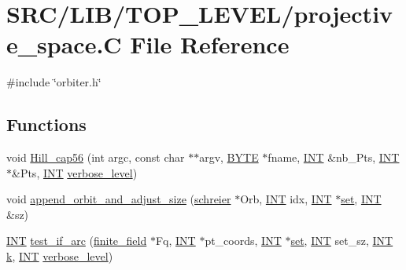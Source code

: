 \hypertarget{_t_o_p___l_e_v_e_l_2projective__space_8_c}{}\section{S\+R\+C/\+L\+I\+B/\+T\+O\+P\+\_\+\+L\+E\+V\+E\+L/projective\+\_\+space.C File Reference}
\label{_t_o_p___l_e_v_e_l_2projective__space_8_c}
{\ttfamily \#include \char`\"{}orbiter.\+h\char`\"{}}\newline
\subsection*{Functions}
\begin{DoxyCompactItemize}
\item 
void \mbox{\hyperlink{_t_o_p___l_e_v_e_l_2projective__space_8_c_ad7fc0ff2bf8455ab25e170c6930047a6}{Hill\+\_\+cap56}} (int argc, const char $\ast$$\ast$argv, \mbox{\hyperlink{galois_8h_ab6cc7b4aeb6ea31aba2b3fbfc83ff5e6}{B\+Y\+TE}} $\ast$fname, \mbox{\hyperlink{galois_8h_a09fddde158a3a20bd2dcadb609de11dc}{I\+NT}} \&nb\+\_\+\+Pts, \mbox{\hyperlink{galois_8h_a09fddde158a3a20bd2dcadb609de11dc}{I\+NT}} $\ast$\&Pts, \mbox{\hyperlink{galois_8h_a09fddde158a3a20bd2dcadb609de11dc}{I\+NT}} \mbox{\hyperlink{simeon_8_c_a818073fbcc2f439e7c56952f67386122}{verbose\+\_\+level}})
\item 
void \mbox{\hyperlink{_t_o_p___l_e_v_e_l_2projective__space_8_c_a1740d8cf43f3d5101704eeca6165ea10}{append\+\_\+orbit\+\_\+and\+\_\+adjust\+\_\+size}} (\mbox{\hyperlink{classschreier}{schreier}} $\ast$Orb, \mbox{\hyperlink{galois_8h_a09fddde158a3a20bd2dcadb609de11dc}{I\+NT}} idx, \mbox{\hyperlink{galois_8h_a09fddde158a3a20bd2dcadb609de11dc}{I\+NT}} $\ast$\mbox{\hyperlink{nauty_8h_a9690bea211101f22a5e154087590c3da}{set}}, \mbox{\hyperlink{galois_8h_a09fddde158a3a20bd2dcadb609de11dc}{I\+NT}} \&sz)
\item 
\mbox{\hyperlink{galois_8h_a09fddde158a3a20bd2dcadb609de11dc}{I\+NT}} \mbox{\hyperlink{_t_o_p___l_e_v_e_l_2projective__space_8_c_a3601e3ab7b739f8a11e6ec0aaf194593}{test\+\_\+if\+\_\+arc}} (\mbox{\hyperlink{classfinite__field}{finite\+\_\+field}} $\ast$Fq, \mbox{\hyperlink{galois_8h_a09fddde158a3a20bd2dcadb609de11dc}{I\+NT}} $\ast$pt\+\_\+coords, \mbox{\hyperlink{galois_8h_a09fddde158a3a20bd2dcadb609de11dc}{I\+NT}} $\ast$\mbox{\hyperlink{nauty_8h_a9690bea211101f22a5e154087590c3da}{set}}, \mbox{\hyperlink{galois_8h_a09fddde158a3a20bd2dcadb609de11dc}{I\+NT}} set\+\_\+sz, \mbox{\hyperlink{galois_8h_a09fddde158a3a20bd2dcadb609de11dc}{I\+NT}} \mbox{\hyperlink{simeon_8_c_a43fa990200c3ddd47c35f151bd4d66bf}{k}}, \mbox{\hyperlink{galois_8h_a09fddde158a3a20bd2dcadb609de11dc}{I\+NT}} \mbox{\hyperlink{simeon_8_c_a818073fbcc2f439e7c56952f67386122}{verbose\+\_\+level}})
$$
\end{DoxyCompactItemize}
